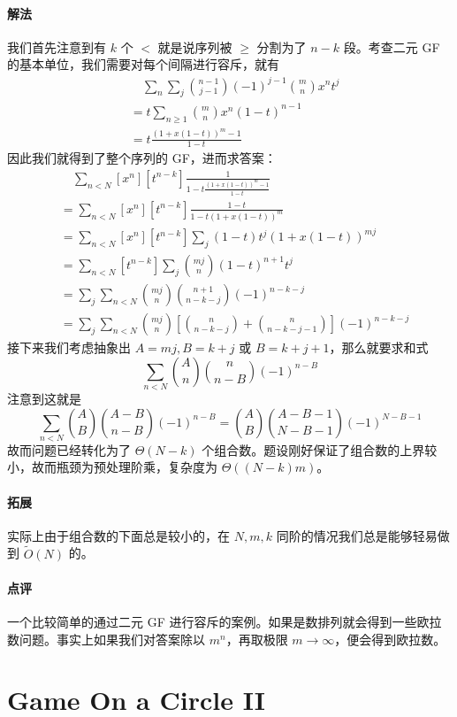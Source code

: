 \documentclass[12pt]{ctexart}
\theoremstyle{theorem}
\theoremstyle{theorem}
\begin{document}
\paragraph{解法} 我们首先注意到有 $k$ 个 $<$ 就是说序列被 $\ge$ 分割为了 $n-k$ 段。考查二元 GF 的基本单位，我们需要对每个间隔进行容斥，就有
\begin{align*}
&\quad \sum_n\sum_j\binom{n-1}{j-1} (-1)^{j-1} \binom m n x^nt^j\\
&= t\sum_{n\ge 1} \binom m n x^n (1-t)^{n-1}\\
&= t\frac{ (1+x(1-t))^m -1 }{1-t}
\end{align*}
因此我们就得到了整个序列的 GF，进而求答案：
\begin{align*}
&\quad \sum_{n<N}[x^n][t^{n-k}]\frac 1{1-t\frac{ (1+x(1-t))^m -1 }{1-t}}\\
&= \sum_{n<N}[x^n][t^{n-k}]\frac{1-t}{1-t(1+x(1-t))^m}\\
&= \sum_{n<N}[x^n][t^{n-k}]\sum_j (1-t)t^j(1+x(1-t))^{mj}\\
&= \sum_{n<N}[t^{n-k}]\sum_j \binom {mj}n (1-t)^{n+1}t^j\\
&= \sum_j \sum_{n<N} \binom {mj}n \binom{n+1}{n-k-j}(-1)^{n-k-j}\\
&= \sum_j \sum_{n<N} \binom {mj}n \left[ \binom n{n-k-j} + \binom n{n-k-j-1} \right](-1)^{n-k-j}
\end{align*}
接下来我们考虑抽象出 $A=mj,B=k+j$ 或 $B=k+j+1$，那么就要求和式
$$
\sum_{n<N} \binom An \binom{n}{n-B}(-1)^{n-B}
$$
注意到这就是
$$
\sum_{n<N} \binom AB \binom{A-B}{n-B}(-1)^{n-B}
=\binom AB \binom{A-B-1}{N-B-1}(-1)^{N-B-1}
$$
故而问题已经转化为了 $\Theta(N-k)$ 个组合数。题设刚好保证了组合数的上界较小，故而瓶颈为预处理阶乘，复杂度为 $\Theta((N-k)m)$。

\paragraph{拓展} 实际上由于组合数的下面总是较小的，在 $N,m,k$ 同阶的情况我们总是能够轻易做到 $\tilde O(N)$ 的。

\paragraph{点评} 一个比较简单的通过二元 GF 进行容斥的案例。如果是数排列就会得到一些欧拉数问题。事实上如果我们对答案除以 $m^n$，再取极限 $m \rightarrow \infty$，便会得到欧拉数。

\newpage

\section{Game On a Circle II}
\end{document}
